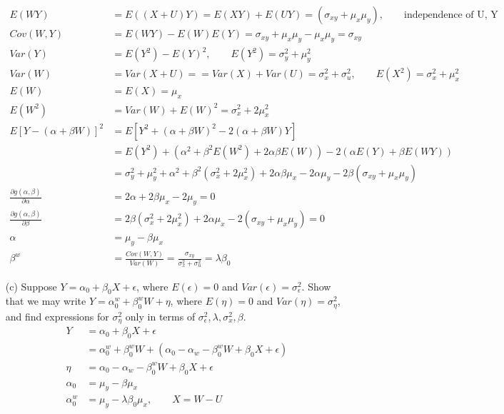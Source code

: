 \documentclass{article}
\begin{document}
\begin{itemize}
\begin{align*}
    E(WY) &= E((X+U)Y) = E(XY) + E(UY) = (\sigma_{xy} + \mu_x\mu_y), \qquad \text{independence of U, Y}\\
    Cov(W,Y) &= E(WY) - E(W)E(Y) = \sigma_{xy} + \mu_x\mu_y - \mu_x\mu_y =\sigma_{xy} \\
    Var(Y) &= E(Y^2) - E(Y)^2, \qquad E(Y^2) = \sigma_y^2 + \mu_y^2\\
    Var(W) &= Var(X+U) = = Var(X) + Var(U) = \sigma_x^2 + \sigma_u^2, \qquad E(X^2) = \sigma_x^2 + \mu_x^2\\
    E(W) &= E(X) = \mu_x\\
    E(W^2) &= Var(W) + E(W)^2 = \sigma_x^2 + 2\mu_x^2 \\
     E[Y-(\alpha + \beta W)]^2 &= E[Y^2 + (\alpha + \beta W)^2 -2(\alpha + \beta W)Y ]\\
     &= E(Y^2) + (\alpha^2 + \beta^2 E(W^2) + 2\alpha\beta E(W)) - 2(\alpha E(Y) + \beta E(WY))\\
     &= \sigma_y^2+\mu_y^2 + \alpha^2 + \beta^2 (\sigma_x^2 + 2\mu_x^2) + 2\alpha\beta \mu_x -2\alpha \mu_y -2 \beta (\sigma_{xy}+ \mu_x\mu_y)\\
     \frac{\partial g(\alpha,\beta)}{\partial \alpha} &= 2\alpha + 2\beta \mu_x - 2\mu_y = 0\\
     \frac{\partial g(\alpha,\beta)}{\partial \beta} &=2\beta (\sigma_x^2 + 2\mu_x^2) + 2\alpha \mu_x -2(\sigma_{xy}+\mu_x\mu_y) = 0\\
     \alpha &= \mu_y - \beta \mu_x\\
     \beta^w &= \frac{Cov(W,Y)}{Var(W)} = \frac{\sigma_{xy}}{\sigma_x^2 + \sigma_u^2} = \lambda \beta_0
    \end{align*} 
    \item[(c)] Suppose $Y=\alpha_0 + \beta_0 X + \epsilon$, where $E(\epsilon) = 0$ and $Var(\epsilon) = \sigma_\epsilon^2$. Show that we may write $Y=\alpha_0^w + \beta_0^w W + \eta$, where $E(\eta) = 0$ and $Var(\eta) = \sigma_\eta^2$, and find expressions for $\sigma_\eta^2$ only in terms of $\sigma_\epsilon^2, \lambda, \sigma_x^2, \beta$.\\
    \begin{align*}
    Y &=\alpha_0 + \beta_0 X + \epsilon\\
    &= \alpha_0^w + \beta_0^w W + (\alpha_0 - \alpha_w - \beta_0^w W + \beta_0 X + \epsilon)\\
    \eta &= \alpha_0 - \alpha_w - \beta_0^w W + \beta_0 X + \epsilon\\
    \alpha_0 &= \mu_y - \beta \mu_x\\
    \alpha_0^w &= \mu_y - \lambda \beta_0\mu_x, \qquad X= W-U\\

\end{align*}
\end{itemize}
\end{document}
